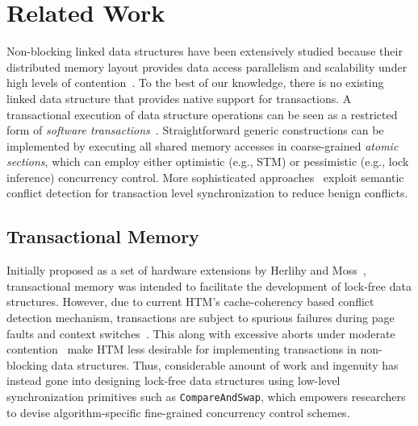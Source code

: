 \documentclass[]{sig-alternate-05-2015}
\begin{document}
\section{Related Work}
\label{sec:related}
Non-blocking linked data structures have been extensively studied because their distributed memory layout provides data access parallelism and scalability under high levels of contention~\cite{linden2013skiplist,zhang2015lockfree,michael2002high}.
To the best of our knowledge, there is no existing linked data structure that provides native support for transactions.
A transactional execution of data structure operations can be seen as a restricted form of \emph{software transactions}~\cite{harris2010transactional}.
Straightforward generic constructions can be implemented by executing all shared memory accesses in coarse-grained \emph{atomic sections}, which can employ either optimistic (e.g., STM) or pessimistic (e.g., lock inference) concurrency control.
More sophisticated approaches~\cite{bronson2010transactional,herlihy2008transactional,golan2015automatic} exploit semantic conflict detection for transaction level synchronization to reduce benign conflicts.

\subsection{Transactional Memory}
Initially proposed as a set of hardware extensions by Herlihy and Moss~\cite{herlihy1993transactional}, transactional memory was intended to facilitate the development of lock-free data structures.
However, due to current HTM's cache-coherency based conflict detection mechanism, transactions are subject to spurious failures during page faults and context switches~\cite{dice2009early}.
This along with excessive aborts under moderate contention~\cite{christina2015resource} make HTM less desirable for implementing transactions in non-blocking data structures.
Thus, considerable amount of work and ingenuity has instead gone into designing lock-free data structures using low-level synchronization primitives such as \texttt{CompareAndSwap}, which empowers researchers to devise algorithm-specific fine-grained concurrency control schemes.
\end{document}

